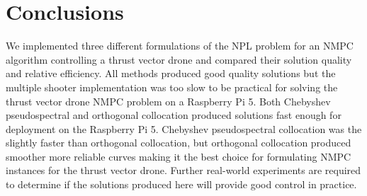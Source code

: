 \documentclass[]{article}
\begin{document}
\section*{Conclusions}
We implemented three different formulations of the NPL problem for an NMPC algorithm controlling a thrust vector drone and compared their solution quality and relative efficiency. All methods produced good quality solutions but the multiple shooter implementation was too slow to be practical for solving the thrust vector drone NMPC problem on a Raspberry Pi 5. Both Chebyshev pseudospectral and orthogonal collocation produced solutions fast enough for deployment on the Raspberry Pi 5. Chebyshev pseudospectral collocation was the slightly faster than orthogonal collocation, but orthogonal collocation produced smoother more reliable curves making it the best choice for formulating NMPC instances for the thrust vector drone.  Further real-world experiments are required to determine if the solutions produced here will provide good control in practice.
	
	
%	


\end{document}
